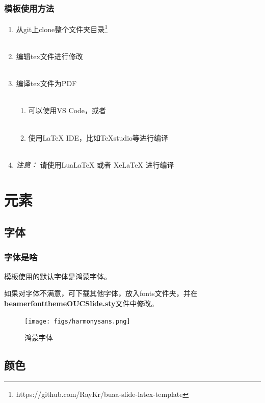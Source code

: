 \documentclass[aspectratio=169,UTF8,t]{beamer}%
\begin{document}
\begin{frame}
    \frametitle{模板使用方法}    
    \begin{enumerate}
        \item 从git上clone整个文件夹目录\footnote{https://github.com/RayKr/buaa-slide-latex-template}\\~
        \item 编辑tex文件进行修改\\~
        \item 编译tex文件为PDF\\~
        \begin{enumerate}
            \item 可以使用VS Code，或者\\~
            \item 使用LaTeX IDE，比如TeXstudio等进行编译\\~
        \end{enumerate}
        \item \emph{注意：} 请使用LuaLaTeX 或者 XeLaTeX 进行编译
    \end{enumerate}
\end{frame}

\section{元素}

\subsection{字体}

\begin{frame}
    \frametitle{字体是啥}
    模板使用的默认字体是鸿蒙字体。

    如果对字体不满意，可下载其他字体，放入fonts文件夹，并在\textbf{beamerfontthemeOUCSlide.sty}文件中修改。
    \begin{center}
        \begin{figure}
        \centering
        \texttt{[image: figs/harmonysans.png]}
            \caption{鸿蒙字体}
            \label{fig:harmonysans}
        \end{figure}
    \end{center}
\end{frame}

\subsection{颜色}
\end{document}
